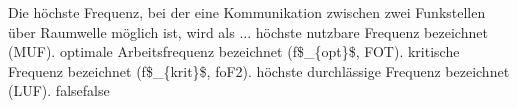     {Die höchste Frequenz, bei der eine Kommunikation zwischen zwei Funkstellen über Raumwelle möglich ist, wird als ...}
    {höchste nutzbare Frequenz bezeichnet (MUF).}
    {optimale Arbeitsfrequenz bezeichnet (f\$\_\{opt\}\$, FOT).
}
    {kritische Frequenz bezeichnet (f\$\_\{krit\}\$, foF2).}
    {höchste durchlässige Frequenz bezeichnet (LUF).}
    {false}{false}